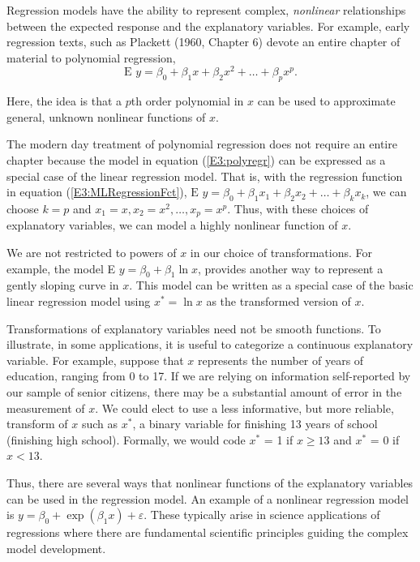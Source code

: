 Regression models have the ability to represent complex,
\emph{nonlinear} relationships between the expected response and the
explanatory variables. For example, early regression texts, such as
Plackett (1960, Chapter 6) devote an entire chapter of material to
polynomial regression,
\begin{equation}\label{E3:polyregr}
\textrm{E } y  =  \beta_0 + \beta_1 x + \beta_2 x^2 + \ldots +
\beta_p x^p.
\end{equation}

\noindent Here, the idea is that a $p$th order polynomial in $x$ can
be used to approximate general, unknown nonlinear functions of $x$.

The modern day treatment of polynomial regression does not require
an entire chapter because the model in equation (\ref{E3:polyregr})
can be expressed as a special case of the linear regression model.
That is, with the regression function in equation
(\ref{E3:MLRegressionFct}), $\textrm{E } y = \beta_0 + \beta_1 x_1 +
\beta_2 x_2 + \ldots + \beta_k x_k$, we can choose $k = p$ and $x_1
= x, x_2 = x^2, \ldots, x_p = x^p$. Thus, with these choices of
explanatory variables, we can model a highly nonlinear function of
$x$.

We are not restricted to powers of $x$ in our choice of
transformations. For example, the model E $y = \beta_0 + \beta_1 \ln
 x$, provides another way to represent a gently sloping curve in
$x$. This model can be written as a special case of the basic linear
regression model using $x^{\ast} = \ln x$ as the transformed version
of $x$.

Transformations of explanatory variables need not be smooth
functions. To illustrate, in some applications, it is useful to
categorize a continuous explanatory variable. For example, suppose
that $x$ represents the number of years of education, ranging from 0
to 17. If we are relying on information self-reported by our sample
of senior citizens, there may be a substantial amount of error in
the measurement of $x$. We could elect to use a less informative,
but more reliable, transform of $x$ such as $x^{\ast}$, a binary
variable for finishing 13 years of school (finishing high school).
Formally, we would code $x^{\ast}$ = 1 if $x \geq 13$ and $x^{\ast}$
= 0 if $x < 13$.

Thus, there are several ways that nonlinear functions of the
explanatory variables can be used in the regression model. An
example of a nonlinear regression model is $y  =  \beta_0 + \exp
(\beta_1 x) + \varepsilon.$ These typically arise in science
applications of regressions where there are fundamental scientific
principles guiding the complex model development.



